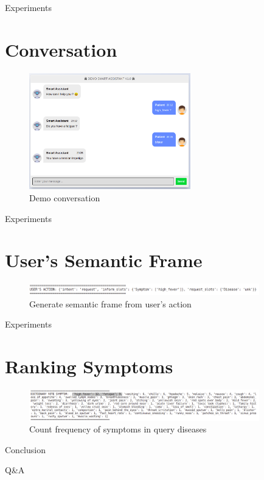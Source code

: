 \documentclass[10pt]{beamer}
\begin{document}

\begin{frame}{Experiments}
    \section{Conversation}
    \begin{figure}[H]
    \centering
    \includegraphics[width=7cm]{image/demo_ui.png}
    \caption{Demo conversation}
    \label{fig:demo}
    \end{figure}
\end{frame}

\begin{frame}{Experiments}
	\section{User's Semantic Frame}
	\begin{figure}[H]
		\centering
		\includegraphics[width=10cm]{image/user_semantic_frame.png}
		\caption{Generate semantic frame from user's action}
		\label{fig:useraction}
	\end{figure}
\end{frame}

\begin{frame}{Experiments}
	\section{Ranking Symptoms}
	\begin{figure}[H]
		\centering
		\includegraphics[width=10cm]{image/dict_vote_sympt.png}
		\caption{Count frequency of symptoms in query diseases}
		\label{fig:dict_vote_sympt}
	\end{figure}
\end{frame}

\begin{frame}{Conclusion}
    \begin{center}
        Q\&A
    \end{center}
\end{frame}
\end{document}

